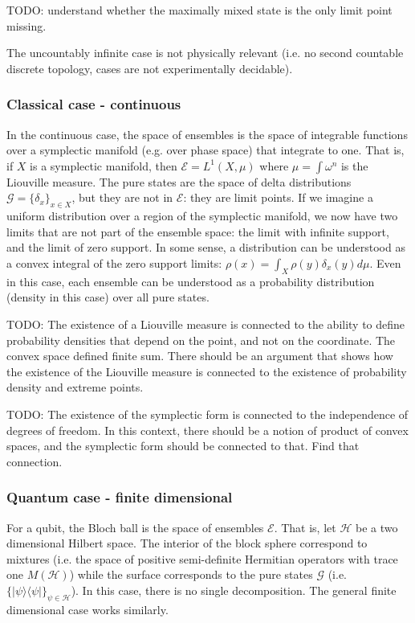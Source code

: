 \documentclass[11pt]{article}
\def\>{\rangle}
\def\<{\langle}
\begin{document}
TODO: understand whether the maximally mixed state is the only limit point missing.

The uncountably infinite case is not physically relevant (i.e. no second countable discrete topology, cases are not experimentally decidable).

\subsubsection{Classical case - continuous}

In the continuous case, the space of ensembles is the space of integrable functions over a symplectic manifold (e.g.  over phase space) that integrate to one. That is, if $X$ is a symplectic manifold, then $\mathcal{E} = L^1(X, \mu)$ where $\mu=\int \omega^n$ is the Liouville measure. The pure states are the space of delta distributions $\mathcal{G} = \{\delta_x\}_{x \in X}$, but they are not in  $\mathcal{E}$: they are limit points. If we imagine a uniform distribution over a region of the symplectic manifold, we now have two limits that are not part of the ensemble space: the limit with infinite support, and the limit of zero support. In some sense, a distribution can be understood as a convex integral of the zero support limits: $\rho(x) = \int_X \rho(y) \delta_x(y) d\mu$. Even in this case, each ensemble can be understood as a probability distribution (density in this case) over all pure states.

TODO: The existence of a Liouville measure is connected to the ability to define probability densities that depend on the point, and not on the coordinate. The convex space defined finite sum. There should be an argument that shows how the existence of the Liouville measure is connected to the existence of probability density and extreme points.

TODO: The existence of the symplectic form is connected to the independence of degrees of freedom. In this context, there should be a notion of product of convex spaces, and the symplectic form should be connected to that. Find that connection.


\subsubsection{Quantum case - finite dimensional}

For a qubit, the Bloch ball is the space of ensembles $\mathcal{E}$. That is, let $\mathcal{H}$ be a two dimensional Hilbert space. The interior of the block sphere correspond to mixtures (i.e. the space of positive semi-definite Hermitian operators with trace one $M(\mathcal{H})$) while the surface corresponds to the pure states $\mathcal{G}$ (i.e. $\{ |\psi\> \<\psi| \}_{\psi \in \mathcal{H}}$). In this case, there is no single decomposition. The general finite dimensional case works similarly.
\end{document}
